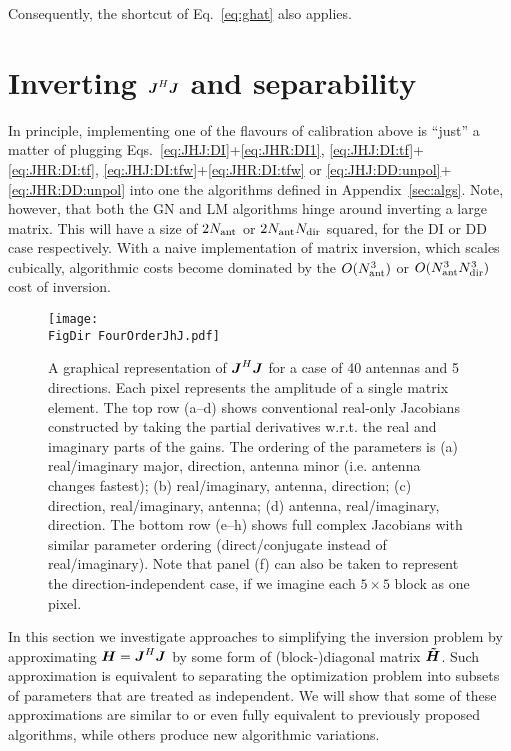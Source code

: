 \documentclass[useAMS,usenatbib]{mn2e}
\newcommand{\mat}[1]{{\bmath{#1}}}
\newcommand{\JJ}{\mat{J}} %
\newcommand{\HH}{\mat{H}} %
\newcommand{\HHa}{\mat{\tilde{H}}} %
\newcommand{\JHJ}{\JJ^H\JJ} %
\newcommand{\FigDir}{../Figures/}
\begin{document}
Consequently, the shortcut of Eq.~\ref{eq:ghat} also applies.

\section{Inverting $\JJ^H\JJ$ and separability}
\label{sec:separability}

In principle, implementing one of the flavours of calibration above is ``just'' a matter of  
plugging Eqs.~\ref{eq:JHJ:DI}+\ref{eq:JHR:DI1}, \ref{eq:JHJ:DI:tf}+\ref{eq:JHR:DI:tf},
\ref{eq:JHJ:DI:tfw}+\ref{eq:JHR:DI:tfw} or \ref{eq:JHJ:DD:unpol}+\ref{eq:JHR:DD:unpol} into one the algorithms defined in 
Appendix~\ref{sec:algs}. Note, however, that both the GN and LM algorithms hinge around 
inverting a large matrix. This will have a size of $2N_\mathrm{ant}$ or $2N_\mathrm{ant}N_\mathrm{dir}$ squared, 
for the DI or DD case respectively. With a naive implementation of matrix inversion, 
which scales cubically, algorithmic costs become dominated by the $O(N_\mathrm{ant}^3)$ or $O(N_\mathrm{ant}^3N_\mathrm{dir}^3)$
cost of inversion.


\begin{figure*}
\begin{center}
\texttt{[image: \\FigDir FourOrderJhJ.pdf]}
\caption{\label{fig:JHJ}A graphical representation of $\JHJ$ for a case of 
40 antennas and 5 directions. Each pixel represents the amplitude of a single matrix element.
The top row (a--d) shows conventional real-only Jacobians constructed by taking the partial derivatives w.r.t. 
the real and imaginary parts of the gains. The ordering of the parameters is (a) real/imaginary major, 
direction, antenna minor (i.e. antenna changes fastest); (b) real/imaginary, antenna, direction; (c) direction, 
real/imaginary, antenna; (d) antenna, real/imaginary, direction. The bottom row (e--h) shows full complex Jacobians with similar parameter ordering (direct/conjugate instead of real/imaginary). Note that panel (f) can also be taken to represent the direction-independent case, if we imagine each $5\times5$ block as one pixel.}
\end{center}
\end{figure*}



In this section we investigate approaches to simplifying the inversion problem by approximating
$\HH=\JJ^H\JJ$ by some form of (block-)diagonal matrix $\HHa$. Such approximation is equivalent to separating
the optimization problem into subsets of parameters that are treated as independent. We will show 
that some of these approximations are similar to or even fully equivalent to previously proposed 
algorithms, while others produce new algorithmic variations.
\end{document}
